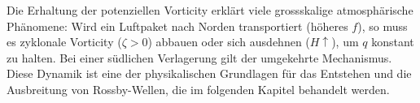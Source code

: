 Die Erhaltung der potenziellen Vorticity erklärt viele grossskalige atmosphärische Phänomene: Wird ein Luftpaket nach Norden transportiert (höheres \(f\)), so muss es zyklonale
Vorticity (\(\zeta > 0\)) abbauen oder sich ausdehnen (\(H \uparrow\)), um
\(q\) konstant zu halten. Bei einer südlichen Verlagerung gilt der umgekehrte
Mechanismus. Diese Dynamik ist eine der physikalischen Grundlagen für das
Entstehen und die Ausbreitung von Rossby-Wellen, die im folgenden Kapitel
behandelt werden.
